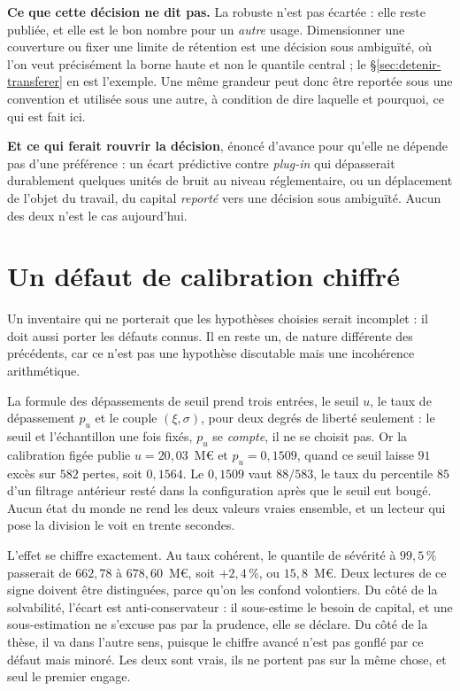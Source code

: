 \begin{attention}
\textbf{Ce que cette décision ne dit pas.} La robuste n'est pas écartée : elle reste publiée, et
elle est le bon nombre pour un \emph{autre} usage. Dimensionner une couverture ou fixer une limite
de rétention est une décision sous ambiguïté, où l'on veut précisément la borne haute et non le
quantile central ; le \S\ref{sec:detenir-transferer} en est l'exemple. Une même grandeur peut donc
être reportée sous une convention et utilisée sous une autre, à condition de dire laquelle et
pourquoi, ce qui est fait ici.

\textbf{Et ce qui ferait rouvrir la décision}, énoncé d'avance pour qu'elle ne dépende pas d'une
préférence : un écart prédictive contre \emph{plug-in} qui dépasserait durablement quelques unités
de bruit au niveau réglementaire, ou un déplacement de l'objet du travail, du capital
\emph{reporté} vers une décision sous ambiguïté. Aucun des deux n'est le cas aujourd'hui.
\end{attention}

\section{Un défaut de calibration chiffré}

Un inventaire qui ne porterait que les hypothèses choisies serait incomplet : il doit aussi
porter les défauts connus. Il en reste un, de nature différente des précédents, car ce n'est
pas une hypothèse discutable mais une incohérence arithmétique.

La formule des dépassements de seuil prend trois entrées, le seuil $u$, le taux de dépassement
$p_u$ et le couple $(\xi,\sigma)$, pour deux degrés de liberté seulement : le seuil et
l'échantillon une fois fixés, $p_u$ se \emph{compte}, il ne se choisit pas. Or la calibration
figée publie $u=20{,}03$~M\euro{} et $p_u=0{,}1509$, quand ce seuil laisse $91$ excès sur $582$
pertes, soit $0{,}1564$. Le $0{,}1509$ vaut $88/583$, le taux du percentile $85$ d'un filtrage
antérieur resté dans la configuration après que le seuil eut bougé. Aucun état du monde ne rend
les deux valeurs vraies ensemble, et un lecteur qui pose la division le voit en trente secondes.

L'effet se chiffre exactement. Au taux cohérent, le quantile de sévérité à $99{,}5\,\%$ passerait
de $662{,}78$ à $678{,}60$~M\euro, soit $+2{,}4\,\%$, ou $15{,}8$~M\euro. Deux lectures de ce signe
doivent être distinguées, parce qu'on les confond volontiers. Du côté de la solvabilité, l'écart
est anti-conservateur : il sous-estime le besoin de capital, et une sous-estimation ne s'excuse
pas par la prudence, elle se déclare. Du côté de la thèse, il va dans l'autre sens, puisque le
chiffre avancé n'est pas gonflé par ce défaut mais minoré. Les deux sont vrais, ils ne portent
pas sur la même chose, et seul le premier engage.

